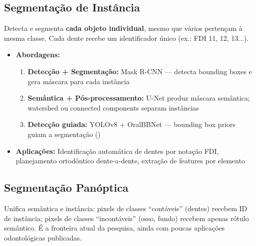 \subsection{Segmentação de Instância}

Detecta e segmenta \textbf{cada objeto individual}, mesmo que vários pertençam
à mesma classe. Cada dente recebe um identificador único (ex.: FDI 11, 12, 13...).

\begin{itemize}
  \item \textbf{Abordagens:}
        \begin{enumerate}
          \item \textbf{Detecção + Segmentação:} Mask R-CNN --- detecta bounding
                boxes e gera máscara para cada instância
          \item \textbf{Semântica + Pós-processamento:} U-Net produz máscara
                semântica; watershed ou connected components separam instâncias
          \item \textbf{Detecção guiada:} YOLOv8 + OralBBNet --- bounding box
                priors guiam a segmentação ()
        \end{enumerate}
  \item \textbf{Aplicações:} Identificação automática de dentes por notação FDI,
        planejamento ortodôntico dente-a-dente, extração de features por elemento
\end{itemize}

\subsection{Segmentação Panóptica}

Unifica semântica e instância: pixels de classes ``contáveis'' (dentes) recebem
ID de instância; pixels de classes ``incontáveis'' (osso, fundo) recebem apenas
rótulo semântico. É a fronteira atual da pesquisa, ainda com poucas aplicações
odontológicas publicadas.



